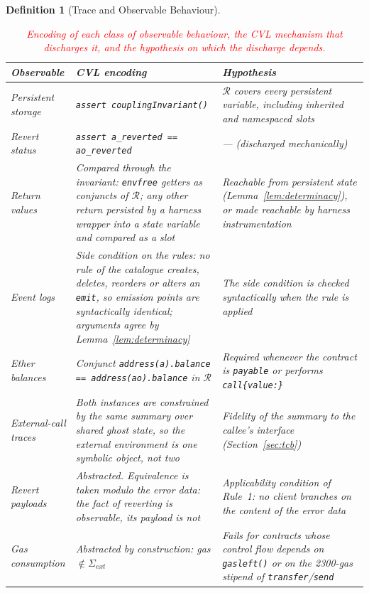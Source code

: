 \documentclass[manuscript,screen,review]{acmart}
\newcommand{\revised}[1]{\textcolor{red}{#1}}
\newenvironment{revisedblock}{\color{red}}{}
\newtheorem{definition}{Definition}
\begin{document}
\begin{definition}[Trace and Observable Behaviour]
\begin{revisedblock}
\begin{table}[htb]
\centering
\color{red}
\caption{\revised{Encoding of each class of observable behaviour, the CVL
  mechanism that discharges it, and the hypothesis on which the discharge
  depends.}}
\label{tab:observables}
\footnotesize
\setlength{\tabcolsep}{4pt}
\begin{tabular}{@{}p{} p{} p{}@{}}
\toprule
\textbf{Observable} & \textbf{CVL encoding} & \textbf{Hypothesis} \\
\midrule
Persistent storage &
  \texttt{assert couplingInvariant()} &
  $\mathcal{R}$ covers every persistent variable, including inherited and
  namespaced slots \\
\addlinespace
Revert status &
  \texttt{assert a\_reverted == ao\_reverted} &
  --- (discharged mechanically) \\
\addlinespace
Return values &
  Compared through the invariant: \texttt{envfree} getters as conjuncts of
  $\mathcal{R}$; any other return persisted by a harness wrapper into a state
  variable and compared as a slot &
  Reachable from persistent state (Lemma~\ref{lem:determinacy}), or made
  reachable by harness instrumentation \\
\addlinespace
Event logs &
  Side condition on the rules: no rule of the catalogue creates, deletes,
  reorders or alters an \texttt{emit}, so emission points are syntactically
  identical; arguments agree by Lemma~\ref{lem:determinacy} &
  The side condition is checked syntactically when the rule is applied \\
\addlinespace
Ether balances &
  Conjunct \texttt{address(a).balance == address(ao).balance} in $\mathcal{R}$ &
  Required whenever the contract is \texttt{payable} or performs
  \texttt{call\{value:\}} \\
\addlinespace
External-call traces &
  Both instances are constrained by the \emph{same} summary over shared ghost
  state, so the external environment is one symbolic object, not two &
  Fidelity of the summary to the callee's interface
  (Section~\ref{sec:tcb}) \\
\addlinespace
Revert payloads &
  \emph{Abstracted.} Equivalence is taken modulo the error data: the
  \emph{fact} of reverting is observable, its payload is not &
  Applicability condition of Rule~1: no client branches on the content of the
  error data \\
\addlinespace
Gas consumption &
  \emph{Abstracted by construction:} gas $\notin \Sigma_{ext}$ &
  Fails for contracts whose control flow depends on \texttt{gasleft()} or on
  the 2300-gas stipend of \texttt{transfer}/\texttt{send} \\
\bottomrule
\end{tabular}
\end{table}


\end{revisedblock}
\end{definition}
\end{document}
